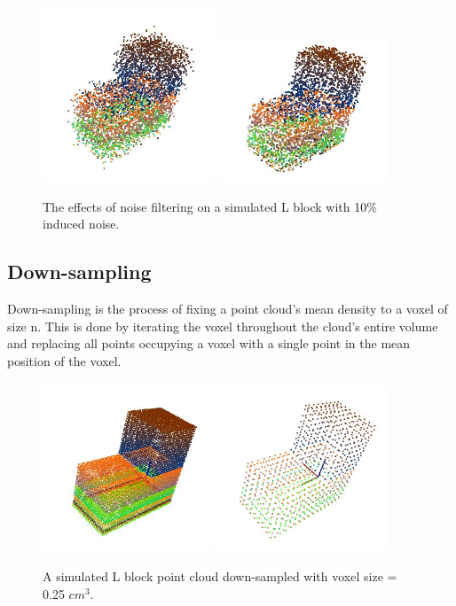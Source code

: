 \documentclass[12pt]{drexelthesis}
\let\Oldsubsection\subsection
\renewcommand{\subsection}{\FloatBarrier\Oldsubsection}
\begin{document}
\begin{figure}[!h]
\centering
\includegraphics[width=2in]{l_block_pt_cloud10pnoise.jpg} \includegraphics[width=2in]{l_block_pt_cloud10pnoiseFILTEREDk100std05.jpg}
\caption[Effects of noise filter on simulated point cloud objects]{\centering The effects of noise filtering on a simulated L block with 10\% induced noise.}
\end{figure}


\subsection{Down-sampling}
Down-sampling is the process of fixing a point cloud’s mean density to a voxel of size n. This is done by iterating the voxel throughout the cloud’s entire volume and replacing all points occupying a voxel with a single point in the mean position of the voxel.

\begin{figure}[!h]
\centering
\includegraphics[width=2in]{l_block_pt_cloud} \includegraphics[width=2in]{l_block_pt_cloudDOWNSAMPLE025.jpg}
\caption[Effects of down-sampling on simulated point cloud objects]{\centering A simulated L block point cloud down-sampled with voxel size = 0.25 $cm^{3}$.}
\end{figure}
\end{document}
